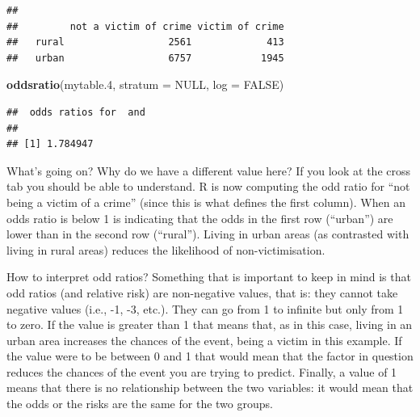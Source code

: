 \documentclass[]{book}
\newenvironment{Shaded}{\begin{snugshade}}{\end{snugshade}}
\newcommand{\DataTypeTok}[1]{\textcolor[rgb]{0.13,0.29,0.53}{#1}}
\newcommand{\FloatTok}[1]{\textcolor[rgb]{0.00,0.00,0.81}{#1}}
\newcommand{\KeywordTok}[1]{\textcolor[rgb]{0.13,0.29,0.53}{\textbf{#1}}}
\newcommand{\NormalTok}[1]{#1}
\newcommand{\OperatorTok}[1]{\textcolor[rgb]{0.81,0.36,0.00}{\textbf{#1}}}
\newcommand{\OtherTok}[1]{\textcolor[rgb]{0.56,0.35,0.01}{#1}}
\theoremstyle{definition}
\theoremstyle{definition}
\theoremstyle{definition}
\theoremstyle{remark}
\begin{document}
\begin{Shaded}
\end{Shaded}

\begin{verbatim}
##        
##         not a victim of crime victim of crime
##   rural                  2561             413
##   urban                  6757            1945
\end{verbatim}

\begin{Shaded}
\begin{Highlighting}[]
\KeywordTok{oddsratio}\NormalTok{(mytable}\FloatTok{.4}\NormalTok{, }\DataTypeTok{stratum =} \OtherTok{NULL}\NormalTok{, }\DataTypeTok{log =} \OtherTok{FALSE}\NormalTok{)}
\end{Highlighting}
\end{Shaded}

\begin{verbatim}
##  odds ratios for  and  
## 
## [1] 1.784947
\end{verbatim}

What's going on? Why do we have a different value here? If you look at
the cross tab you should be able to understand. R is now computing the
odd ratio for ``not being a victim of a crime'' (since this is what
defines the first column). When an odds ratio is below 1 is indicating
that the odds in the first row (``urban'') are lower than in the second
row (``rural''). Living in urban areas (as contrasted with living in
rural areas) reduces the likelihood of non-victimisation.

How to interpret odd ratios? Something that is important to keep in mind
is that odd ratios (and relative risk) are non-negative values, that is:
they cannot take negative values (i.e., -1, -3, etc.). They can go from
1 to infinite but only from 1 to zero. If the value is greater than 1
that means that, as in this case, living in an urban area increases the
chances of the event, being a victim in this example. If the value were
to be between 0 and 1 that would mean that the factor in question
reduces the chances of the event you are trying to predict. Finally, a
value of 1 means that there is no relationship between the two
variables: it would mean that the odds or the risks are the same for the
two groups.
\end{document}
